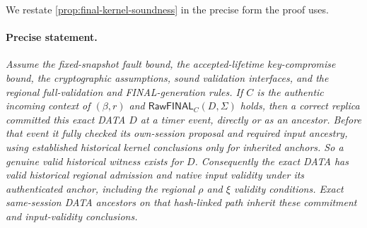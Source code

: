 \documentclass[11pt,a4paper]{article}
\newcommand{\tagg}[1]{\ensuremath{\mathsf{#1}}}
\begin{document}
We restate \cref{prop:final-kernel-soundness} in the precise form the
proof uses.

\paragraph{Precise statement.}
\textit{Assume the fixed-snapshot fault bound, the accepted-lifetime
key-compromise bound, the cryptographic assumptions, sound validation
interfaces, and the regional full-validation and FINAL-generation rules.
If $C$ is the authentic incoming context of $(\beta,r)$ and
$\tagg{RawFINAL}_C(D,\Sigma)$ holds, then a correct replica committed
this exact DATA $D$ at a timer event, directly or as an ancestor. Before
that event it fully checked its own-session proposal and required input
ancestry, using established historical kernel conclusions only for
inherited anchors. So a genuine valid historical witness exists for $D$.
Consequently the exact DATA has valid historical regional admission and
native input validity under its authenticated anchor, including the
regional $\rho$ and $\xi$ validity conditions. Exact same-session DATA
ancestors on that hash-linked path inherit these commitment and
input-validity conclusions.}
\end{document}

